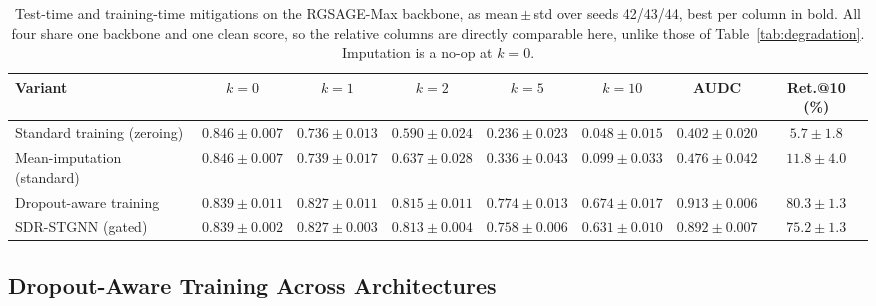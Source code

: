 \documentclass[3p,times,procedia]{elsarticle}
\begin{document}
\begin{table}[!tb]
  \centering
  \caption{Test-time and training-time mitigations on the RGSAGE-Max backbone, as
           mean\,$\pm$\,std over seeds 42/43/44, best per column in bold. All four share
           one backbone and one clean score, so the relative columns are directly
           comparable here, unlike those of Table~\ref{tab:degradation}. Imputation is a
           no-op at $k{=}0$.}
  \label{tab:aware}
  \footnotesize
  \setlength{\tabcolsep}{4pt}
  \begin{tabular}{@{}lccccccc@{}}
    \toprule
    Variant & $k{=}0$ & $k{=}1$ & $k{=}2$ & $k{=}5$ & $k{=}10$ & AUDC & Ret.@10 (\%) \\
    \midrule
    Standard training (zeroing)
      & $\mathbf{0.846}{\pm}\mathbf{0.007}$
      & $0.736{\pm}0.013$
      & $0.590{\pm}0.024$
      & $0.236{\pm}0.023$
      & $0.048{\pm}0.015$
      & $0.402{\pm}0.020$ & $5.7{\pm}1.8$ \\
    Mean-imputation (standard)
      & $0.846{\pm}0.007$
      & $0.739{\pm}0.017$
      & $0.637{\pm}0.028$
      & $0.336{\pm}0.043$
      & $0.099{\pm}0.033$
      & $0.476{\pm}0.042$ & $11.8{\pm}4.0$ \\
    Dropout-aware training
      & $0.839{\pm}0.011$
      & $\mathbf{0.827}{\pm}\mathbf{0.011}$
      & $\mathbf{0.815}{\pm}\mathbf{0.011}$
      & $\mathbf{0.774}{\pm}\mathbf{0.013}$
      & $\mathbf{0.674}{\pm}\mathbf{0.017}$
      & $\mathbf{0.913}{\pm}\mathbf{0.006}$ & $\mathbf{80.3}{\pm}\mathbf{1.3}$ \\
    SDR-STGNN (gated)
      & $0.839{\pm}0.002$
      & $0.827{\pm}0.003$
      & $0.813{\pm}0.004$
      & $0.758{\pm}0.006$
      & $0.631{\pm}0.010$
      & $0.892{\pm}0.007$ & $75.2{\pm}1.3$ \\
    \bottomrule
  \end{tabular}
\end{table}


\subsection{Dropout-Aware Training Across Architectures}
\label{sec:res-agnostic}
\end{document}
